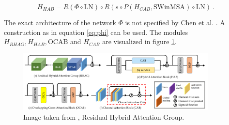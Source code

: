     $$H_{HAB} = R( \Phi \circ \text{LN} ) \circ R( s \circ P(H_{CAB}, \text{SWinMSA}) \circ \text{LN} ) ~. $$

The exact architecture of the network $\Phi$ is not specified by Chen et al. \cite{chenHATHybridAttention2024}.
A construction as in equation \ref{eq:phi} can be used.
The modules $H_{RHAG}, H_{HAB}, \text{OCAB}$ and $H_{CAB}$ are visualized in figure \ref{fig:hat_modules}.

\begin{figure}[h!]
    \includegraphics[width=0.9\textwidth]{models/sisr/imgs/rhag.png}
    \caption{Image taken from \cite{chenHATHybridAttention2024}, Residual Hybrid Attention Group.}
    \label{fig:hat_modules}
\end{figure}